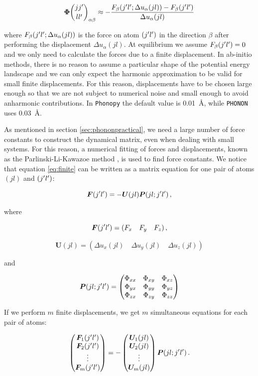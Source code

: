 \begin{equation}
\fc _{\alpha \beta} \approx - \frac{F_\beta (\jp \lp; \Delta u_\alpha (jl)) - F_\beta (\jp\lp)}{\Delta u_\alpha (jl)} \label{eq:finite}
\end{equation}


\noindent where $F_\beta (j^\prime l^\prime;\Delta u_\alpha (jl))$ is the force on atom $(j^\prime l^\prime)$ in the direction $\beta$ after performing the displacement $\Delta u_\alpha (jl)$. At equilibrium we assume $F_\beta (j^\prime l^\prime) = 0$ and we only need to calculate the forces due to a finite displacement. In ab-initio methods, there is no reason to assume a particular shape of the potential energy landscape and we can only expect the harmonic approximation to be valid for small finite displacements. For this reason, displacements have to be chosen large enough so that we are not subject to numerical noise and small enough to avoid anharmonic contributions. In \texttt{Phonopy} the default value is \SI{0.01}{\angstrom}, while \texttt{PHONON} uses \SI{0.03}{\angstrom}.

As mentioned in section \ref{sec:phononpractical}, we need a large number of force constants to construct the dynamical matrix, even when dealing with small systems. For this reason, a numerical fitting of forces and displacements, known as the Parlinski-Li-Kawazoe method \cite{Parlinski1997}, is used to find force constants. We notice that equation \eqref{eq:finite} can be written as a matrix equation for one pair of atoms $(jl)$ and $(j^\prime l^\prime)$:

\[ \bm{F}(j^\prime l^\prime) = -\bm{U}(jl) \bm{P} (jl;j^\prime l^\prime) \, , \]

\noindent where

\[ \bm{F}(j^\prime l^\prime) = (F_x \quad F_y \quad F_z) \, , \]

\[ \bm{U}(jl) = \left( \Delta u_x(jl) \quad \Delta u_y(jl) \quad \Delta u_z(jl) \right)  \]

\noindent and

\[ 
\bm{P} (jl;j^\prime l^\prime) = 	
\begin{pmatrix}
\Phi_{xx} & \Phi_{xy} & \Phi_{xz} \\
\Phi_{yx} & \Phi_{yy} & \Phi_{yz} \\
\Phi_{zx} & \Phi_{zy} & \Phi_{zz} 
\end{pmatrix}
\]

\noindent If we perform $m$ finite displacements, we get $m$ simultaneous equations for each pair of atoms:

\begin{equation*}
\begin{pmatrix} \bm{F}_1(j^\prime l^\prime) \\ \bm{F}_2(j^\prime l^\prime) \\ \vdots \\ \bm{F}_m(j^\prime l^\prime) \end{pmatrix} =
- \begin{pmatrix} \bm{U}_1(jl) \\ \bm{U}_2(jl) \\ \vdots \\ \bm{U}_m(jl) \end{pmatrix} \bm{P}(jl;j^\prime l^\prime) \, .
\end{equation*}

